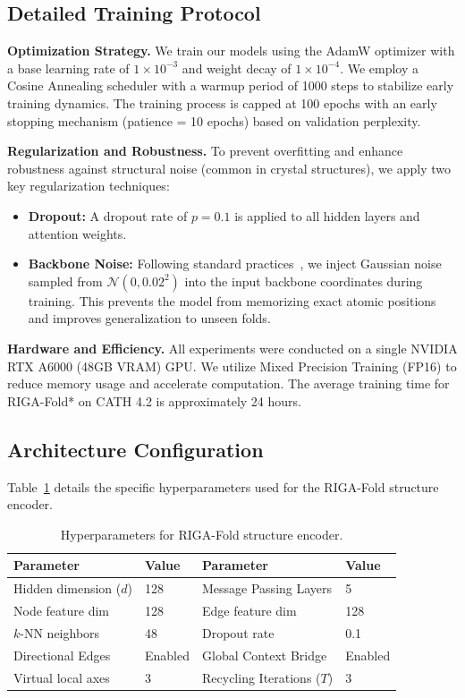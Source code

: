 \documentclass{article}
\theoremstyle{plain}
\theoremstyle{definition}
\theoremstyle{remark}
\begin{document}
{\subsection{Detailed Training Protocol}
\textbf{Optimization Strategy.} We train our models using the AdamW optimizer with a base learning rate of $1\times 10^{-3}$ and weight decay of $1\times 10^{-4}$. We employ a Cosine Annealing scheduler with a warmup period of 1000 steps to stabilize early training dynamics. The training process is capped at 100 epochs with an early stopping mechanism (patience = 10 epochs) based on validation perplexity.

\textbf{Regularization and Robustness.} To prevent overfitting and enhance robustness against structural noise (common in crystal structures), we apply two key regularization techniques:
\begin{itemize}
    \item \textbf{Dropout:} A dropout rate of $p=0.1$ is applied to all hidden layers and attention weights.
    \item \textbf{Backbone Noise:} Following standard practices~\cite{dauparas2022robust}, we inject Gaussian noise sampled from $\mathcal{N}(0, 0.02^2)$ into the input backbone coordinates during training. This prevents the model from memorizing exact atomic positions and improves generalization to unseen folds.
\end{itemize}

\textbf{Hardware and Efficiency.} All experiments were conducted on a single NVIDIA RTX A6000 (48GB VRAM) GPU. We utilize Mixed Precision Training (FP16) to reduce memory usage and accelerate computation. The average training time for RIGA-Fold* on CATH 4.2 is approximately 24 hours.

\subsection{Architecture Configuration}
Table~\ref{tab:arch_config} details the specific hyperparameters used for the RIGA-Fold structure encoder.

\begin{table}[h]
\centering
\caption{Hyperparameters for RIGA-Fold structure encoder.}
\label{tab:arch_config}
\begin{tabular}{@{}ll@{\qquad}ll@{}}
\toprule
\textbf{Parameter} & \textbf{Value} & \textbf{Parameter} & \textbf{Value} \\
\midrule
Hidden dimension ($d$) & 128 & Message Passing Layers & 5 \\
Node feature dim & 128 & Edge feature dim & 128 \\
$k$-NN neighbors & 48 & Dropout rate & 0.1 \\
Directional Edges & Enabled & Global Context Bridge & Enabled \\
Virtual local axes & 3 & Recycling Iterations ($T$) & 3 \\
\bottomrule
\end{tabular}
\end{table}

}
\end{document}
